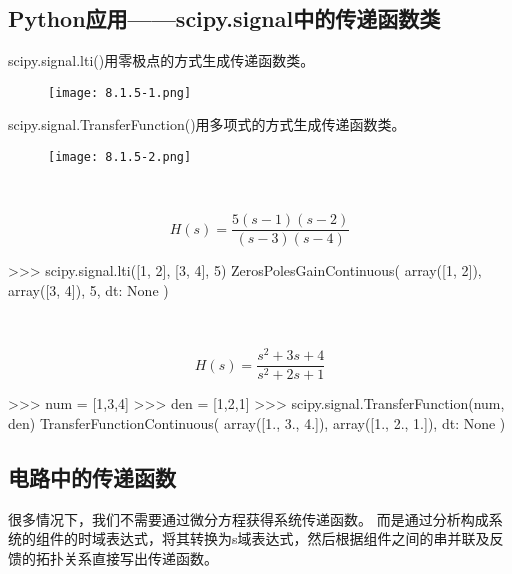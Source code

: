 \subsection{Python应用——scipy.signal中的传递函数类}

scipy.signal.lti()用零极点的方式生成传递函数类。
\begin{figure}[h]
\centering
\texttt{[image: 8.1.5-1.png]}
\end{figure}

scipy.signal.TransferFunction()用多项式的方式生成传递函数类。
\begin{figure}[h]
\centering
\texttt{[image: 8.1.5-2.png]}
\end{figure}

~

\begin{example}
\[
H\left( s \right) =\frac{5\left( s-1 \right) \left( s-2 \right)}{\left( s-3 \right) \left( s-4 \right)}
\]
\end{example}

\begin{python}
>>> scipy.signal.lti([1, 2], [3, 4], 5)
ZerosPolesGainContinuous(
array([1, 2]),
array([3, 4]),
5,
dt: None
)
\end{python}

~

\begin{example}
\[
H\left( s \right) =\frac{s^2+3s+4}{s^2+2s+1}
\]
\end{example}

\begin{python}
>>> num = [1,3,4]
>>> den = [1,2,1]
>>> scipy.signal.TransferFunction(num, den)
TransferFunctionContinuous(
array([1., 3., 4.]),
array([1., 2., 1.]),
dt: None
)
\end{python}

\subsection{电路中的传递函数}

\begin{tcolorbox}
很多情况下，我们不需要通过微分方程获得系统传递函数。
而是通过分析构成系统的组件的时域表达式，将其转换为s域表达式，然后根据组件之间的串并联及反馈的拓扑关系直接写出传递函数。
\end{tcolorbox}

